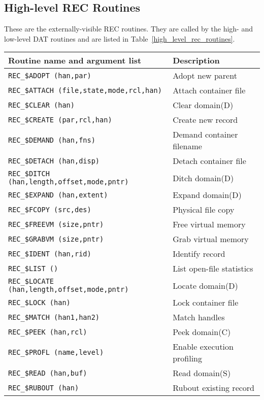 \clearpage
\subsection {High-level REC Routines}

These are the externally-visible REC routines. They are called by the high-
and low-level DAT routines and are listed in
Table~\ref{high_level_rec_routines}.

\begin {table}[htbp]
\begin {center}
\begin {tabular}{||l|l||}               
\hline
Routine name and argument list	& Description \\
\hline
{\tt REC\_\$ADOPT (han,par)}	& Adopt new parent \\
{\tt REC\_\$ATTACH (file,state,mode,rcl,han)} & Attach container file \\
{\tt REC\_\$CLEAR (han)}	& Clear domain(D) \\
{\tt REC\_\$CREATE (par,rcl,han)} & Create new record \\
{\tt REC\_\$DEMAND (han,fns)}	& Demand container filename \\
{\tt REC\_\$DETACH (han,disp)}	& Detach container file \\
{\tt REC\_\$DITCH (han,length,offset,mode,pntr)} & Ditch domain(D) \\
{\tt REC\_\$EXPAND (han,extent)} & Expand domain(D) \\
{\tt REC\_\$FCOPY (src,des)}	& Physical file copy \\
{\tt REC\_\$FREEVM (size,pntr)} & Free virtual memory  \\
{\tt REC\_\$GRABVM (size,pntr)} & Grab virtual memory  \\
{\tt REC\_\$IDENT (han,rid)}	& Identify record \\
{\tt REC\_\$LIST ()}		& List open-file statistics \\
{\tt REC\_\$LOCATE (han,length,offset,mode,pntr)} & Locate domain(D) \\
{\tt REC\_\$LOCK (han)}		& Lock container file \\
{\tt REC\_\$MATCH (han1,han2)}	& Match handles \\
{\tt REC\_\$PEEK (han,rcl)}	& Peek domain(C) \\
{\tt REC\_\$PROFL (name,level)}	& Enable execution profiling \\
{\tt REC\_\$READ (han,buf)}	& Read domain(S) \\
{\tt REC\_\$RUBOUT (han)}	& Rubout existing record \\

\end{tabular}
\end{center}
\end{table}
